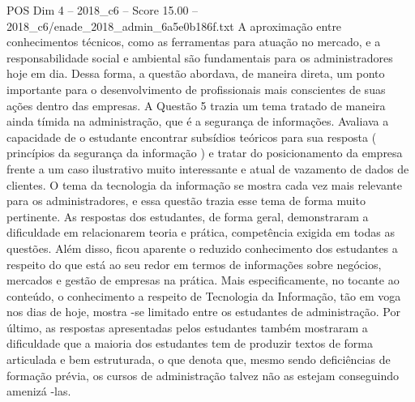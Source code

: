 \begin{textsample}{POS Dim 4 – 2018\_c6 – Score 15.00 – 2018\_c6/enade\_2018\_admin\_6a5e0b186f.txt}
A aproximação entre conhecimentos técnicos, como as ferramentas para atuação no mercado, e a responsabilidade social e ambiental são fundamentais para os administradores hoje em dia.
Dessa forma, a questão abordava, de maneira direta, um ponto importante para o desenvolvimento de profissionais mais conscientes de suas ações dentro das empresas.
A Questão 5 trazia um tema tratado de maneira ainda tímida na administração, que é a segurança de informações.
Avaliava a capacidade de o estudante encontrar subsídios teóricos para sua resposta ( princípios da segurança da informação ) e tratar do posicionamento da empresa frente a um caso ilustrativo muito interessante e atual de vazamento de dados de clientes.
O tema da tecnologia da informação se mostra cada vez mais relevante para os administradores, e essa questão trazia esse tema de forma muito pertinente.
As respostas dos estudantes, de forma geral, demonstraram a dificuldade em relacionarem teoria e prática, competência exigida em todas as questões.
Além disso, ficou aparente o reduzido conhecimento dos estudantes a respeito do que está ao seu redor em termos de informações sobre negócios, mercados e gestão de empresas na prática.
Mais especificamente, no tocante ao conteúdo, o conhecimento a respeito de Tecnologia da Informação, tão em voga nos dias de hoje, mostra -se limitado entre os estudantes de administração.
Por último, as respostas apresentadas pelos estudantes também mostraram a dificuldade que a maioria dos estudantes tem de produzir textos de forma articulada e bem estruturada, o que denota que, mesmo sendo deficiências de formação prévia, os cursos de administração talvez não as estejam conseguindo amenizá -las.

\end{textsample}
